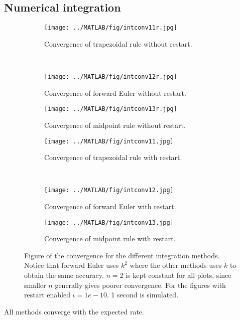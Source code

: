 \subsection{Numerical integration}%
\begin{figure}[H]
        \centering
        \begin{subfigure}[b]{0.30\textwidth}
                \texttt{[image: ../MATLAB/fig/intconv11r.jpg]}
                \caption{ Convergence of trapezoidal rule without restart. }
                \label{fig:intconv11r}
        \end{subfigure}
        ~
        \begin{subfigure}[b]{0.30\textwidth}
                \texttt{[image: ../MATLAB/fig/intconv12r.jpg]}
                \caption{ Convergence of forward Euler without restart. }
                \label{fig:intconv12r}
        \end{subfigure}
        \begin{subfigure}[b]{0.30\textwidth}
                \texttt{[image: ../MATLAB/fig/intconv13r.jpg]}
                \caption{ Convergence of midpoint rule without restart. }
                \label{fig:intconv13r}
        \end{subfigure}         
        
        \begin{subfigure}[b]{0.30\textwidth}
                \texttt{[image: ../MATLAB/fig/intconv11.jpg]}
                \caption{ Convergence of trapezoidal rule with restart. }
                \label{fig:intconv11}
        \end{subfigure}
        ~
        \begin{subfigure}[b]{0.30\textwidth}
                \texttt{[image: ../MATLAB/fig/intconv12.jpg]}
                \caption{ Convergence of forward Euler with restart. }
                \label{fig:intconv12}
        \end{subfigure}
        \begin{subfigure}[b]{0.30\textwidth}
                \texttt{[image: ../MATLAB/fig/intconv13.jpg]}
                \caption{ Convergence of midpoint rule with restart. }
                \label{fig:intconv13}
        \end{subfigure}
        
 
\caption{Figure of the convergence for the different integration methods. Notice that forward Euler uses $k^2$ where the other methods uses $k$ to obtain the same accuracy. $n=2$ is kept constant for all plots, since smaller $n$ generally gives poorer convergence. For the figures with restart enabled $\iota = 1e-10$. 1 second is simulated. }
\label{fig:intconv}
\end{figure}
All methods converge with the expected rate. \\

